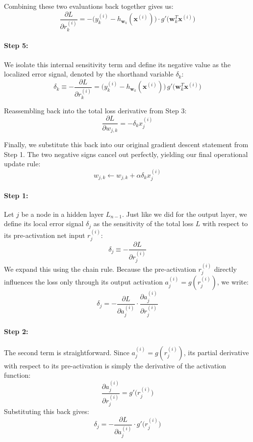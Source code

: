 Combining these two evaluations back together gives us:
\[
\frac{\partial L}{\partial r_k^{(i)}} = -\big(y_k^{(i)} - h_{\mathbf{w}_k}(\mathbf{x}^{(i)})\big) \cdot g'\big(\mathbf{w}_k^T\mathbf{x}^{(i)}\big)
\]

\paragraph{Step 5:}
We isolate this internal sensitivity term and define its negative value as the localized error signal, denoted by the shorthand variable $\delta_k$:
\[
\delta_k \equiv -\frac{\partial L}{\partial r_k^{(i)}} = \big(y_k^{(i)} - h_{\mathbf{w}_k}(\mathbf{x}^{(i)})\big)\, g'\big(\mathbf{w}_k^T\mathbf{x}^{(i)}\big)
\]

Reassembling back into the total loss derivative from Step 3:
\[
\frac{\partial L}{\partial w_{j,k}} = -\delta_k x_j^{(i)}
\]

Finally, we substitute this back into our original gradient descent statement from Step 1. The two negative signs cancel out perfectly, yielding our final operational update rule:
\[
w_{j,k} \leftarrow w_{j,k} + \alpha \delta_k x_j^{(i)}
\]



\paragraph{Step 1:}
Let $j$ be a node in a hidden layer $L_{n-1}$. Just like we did for the output layer, we define its local error signal $\delta_j$ as the sensitivity of the total loss $L$ with respect to its pre-activation net input $r_j^{(i)}$:
\[
\delta_j \equiv -\frac{\partial L}{\partial r_j^{(i)}}
\]
We expand this using the chain rule. Because the pre-activation $r_j^{(i)}$ directly influences the loss only through its output activation $a_j^{(i)} = g(r_j^{(i)})$, we write:
\[
\delta_j = -\frac{\partial L}{\partial a_j^{(i)}} \cdot \frac{\partial a_j^{(i)}}{\partial r_j^{(i)}}
\]

\paragraph{Step 2:}
The second term is straightforward. Since $a_j^{(i)} = g(r_j^{(i)})$, its partial derivative with respect to its pre-activation is simply the derivative of the activation function:
\[
\frac{\partial a_j^{(i)}}{\partial r_j^{(i)}} = g'\big(r_j^{(i)}\big)
\]
Substituting this back gives:
\[
\delta_j = -\frac{\partial L}{\partial a_j^{(i)}} \cdot g'\big(r_j^{(i)}\big)
\]

